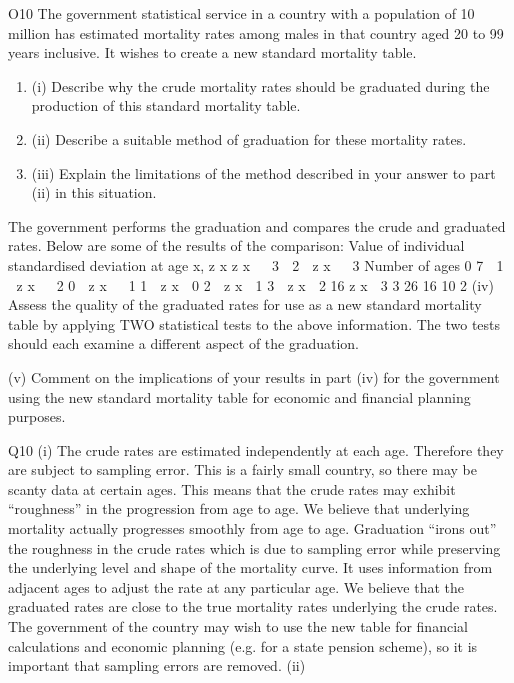 \documentclass[a4paper,12pt]{article}
\begin{document}
O10
The government statistical service in a country with a population of 10 million has
estimated mortality rates among males in that country aged 20 to 99 years inclusive.
It wishes to create a new standard mortality table.

\begin{enumerate}
\item (i)
Describe why the crude mortality rates should be graduated during the
production of this standard mortality table.
\item 
(ii) Describe a suitable method of graduation for these mortality rates.
\item 
(iii) Explain the limitations of the method described in your answer to part (ii) in
this situation.
\end{enumerate}

The government performs the graduation and compares the crude and graduated rates.
Below are some of the results of the comparison:
Value of individual standardised
deviation at age x, z x
z x   3
 2  z x   3
Number of ages
0
7
 1  z x   2
0  z x   1
1  z x  0
2  z x  1
3  z x  2 16
z x  3 3
26
16
10
2
(iv) Assess the quality of the graduated rates for use as a new standard mortality
table by applying TWO statistical tests to the above information. The two
tests should each examine a different aspect of the graduation.

(v) Comment on the implications of your results in part (iv) for the government
using the new standard mortality table for economic and financial planning
purposes.



Q10
(i)
The crude rates are estimated independently at each age. 
Therefore they are subject to sampling error. 
This is a fairly small country, so there may be scanty data at certain ages. 
This means that the crude rates may exhibit “roughness” in the
progression from age to age. 
We believe that underlying mortality actually progresses smoothly
from age to age. 
Graduation “irons out” the roughness in the crude rates which is due to
sampling error while preserving the underlying level and shape of the
mortality curve. 
It uses information from adjacent ages to adjust the rate at any particular age. 
We believe that the graduated rates are close to the true mortality rates underlying the crude rates. 
The government of the country may wish to use the new table for financial calculations and economic planning (e.g. for a state
pension scheme), so it is important that sampling errors are removed.
(ii)
\end{document}
